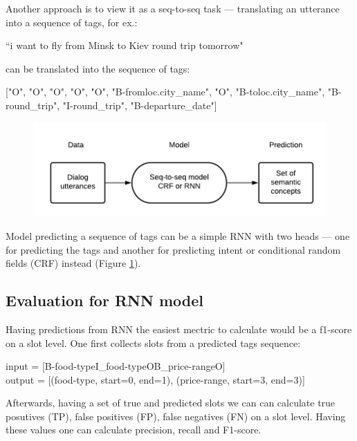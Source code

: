 \documentclass[12pt,titlepage,a4paper]{article}
\begin{document}
Another approach is to view it as a seq-to-seq task ---  translating an utterance into a sequence of tags, for ex.:

\begin{center}
    ``i want to fly from Minsk to Kiev round trip tomorrow" 
\end{center}

can be translated into the sequence of tags: 
\begin{center}
    ["O", "O", "O", "O", "O", "B-fromloc.city\_name", "O", "B-toloc.city\_name", "B-round\_trip", "I-round\_trip", "B-departure\_date"]
\end{center}
\begin{figure}[!h]
    \centering
    \includegraphics[width=0.91\linewidth]{training-2-2.png}
    \caption{}
    \label{fig:semantic-decoding-seq2seq}
\end{figure}

Model predicting a sequence of tags can be a simple RNN with two heads --- one for predicting the tags and another for predicting intent or conditional random fields (CRF) instead (Figure \ref{fig:semantic-decoding-seq2seq}).

\subsection{Evaluation for RNN model}

Having predictions from RNN the easiest mectric to calculate would be a f1-score on a slot level. One first collects slots from a predicted tags sequence:
\begin{center}
    input = [B-food-type\quad I\_food-type\quad O\quad B\_price-range\quad O] \\
    output = [(food-type, start=0, end=1), (price-range, start=3, end=3)]
\end{center}

Afterwards, having a set of true and predicted slots we can can calculate true posutives (TP), false positives (FP), false negatives (FN) on a slot level. Having these values one can calculate precision, recall and F1-score.
\end{document}
